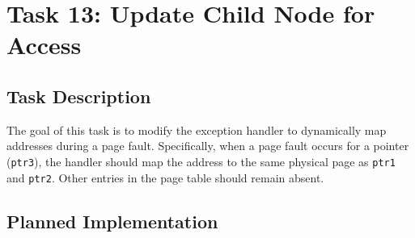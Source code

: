 \documentclass[a4paper,12pt]{report}
\begin{document}
\chapter{Task 13: Update Child Node for Access}

\section{Task Description}
The goal of this task is to modify the exception handler to dynamically map addresses during a page fault. Specifically, when a page fault occurs for a pointer (\texttt{ptr3}), the handler should map the address to the same physical page as \texttt{ptr1} and \texttt{ptr2}. Other entries in the page table should remain absent.

\section{Planned Implementation}
\end{document}
